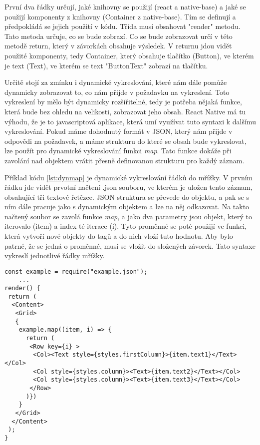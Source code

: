 \documentclass[11pt,twoside,a4paper]{book}
\begin{document}
První dva řádky určují, jaké knihovny se použijí (react a native-base) a jaké se použijí komponenty z knihovny (Container z native-base). Tím se definují a předpokládá se jejich použití v kódu. Třída musí obsahovat "render" metodu. Tato metoda určuje, co se bude zobrazí. Co se bude zobrazovat určí v této metodě return, který v závorkách obsahuje výsledek. V returnu jdou vidět použité komponenty, tedy Container, který obsahuje tlačítko (Button), ve kterém je text (Text), ve kterém se text "ButtonText" zobrazí na tlačítku.

Určitě stojí za zmínku i dynamické vykreslování, které nám dále pomůže dynamicky zobrazovat to, co nám přijde v požadavku na vykreslení. Toto vykreslení by mělo být dynamicky rozšířitelné, tedy je potřeba nějaká funkce, která bude bez ohledu na velikosti, zobrazovat jeho obsah. React Native má tu výhodu, že je to javascriptová aplikace, která umí využívat tuto syntaxi k dalšímu vykreslování. Pokud máme dohodnutý formát v JSON, který nám přijde v odpovědi na požadavek, a máme strukturu do které se obsah bude vykreslovat, lze použít pro dynamické vykreslování funkci \textit{map}. Tato funkce dokáže při zavolání nad objektem vrátit přesně definovanou strukturu pro každý záznam. 

Příklad kódu \ref{lst:dynmap} je dynamické vykreslování řádků do mřížky. V prvním řádku jde vidět prvotní načtení .json souboru, ve kterém je uložen tento záznam, obsahující tři textové řetězce. JSON struktura se převede do objektu, a pak se s ním dále pracuje jako s dynamickým objektem a lze na něj odkazovat. Na takto načtený soubor se zavolá funkce \textit{map}, a jako dva parametry jsou objekt, který to iterovalo (item) a index té iterace (i). Tyto proměnné se poté použijí ve funkci, která vytvoří nové objekty do tagů a do nich vloží tuto hodnotu. Aby bylo patrné, že se jedná o proměnné, musí se vložit do složených závorek. Tato syntaxe vykreslí jednotlivé řádky mřížky.

\begin{minipage}{\linewidth}
\begin{lstlisting}[caption=Dynamické vykreslování obsahu funkcí map,label={lst:dynmap}] 
const example = require("example.json");
	...
render() {
 return (
  <Content>
   <Grid>
   {
    example.map((item, i) => {
      return (
       <Row key={i} >
        <Col><Text style={styles.firstColumn}>{item.text1}</Text></Col>
        <Col style={styles.column}><Text>{item.text2}</Text></Col>
        <Col style={styles.column}><Text>{item.text3}</Text></Col>
       </Row>
      )})
    }
   </Grid>
  </Content>
 );
}
\end{lstlisting}
\end{minipage}
\end{document}

